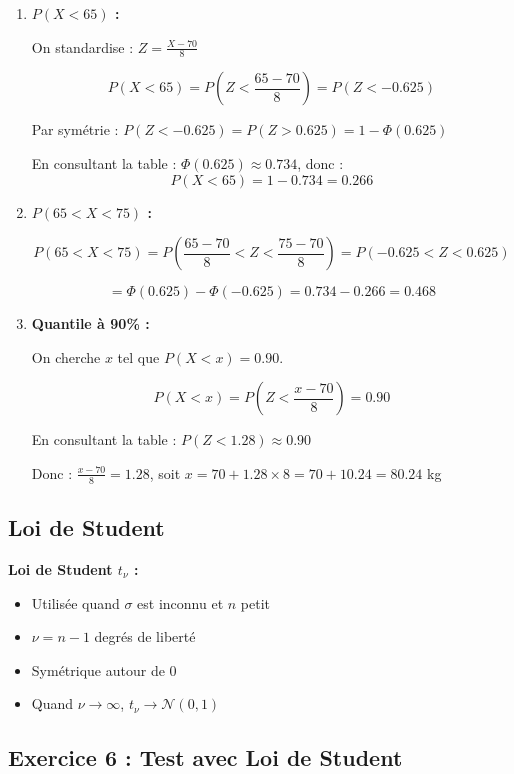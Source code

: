\documentclass[11pt,a4paper]{article}
\begin{document}
\begin{enumerate}
    \item \textbf{$P(X < 65)$ :}
    
    On standardise : $Z = \frac{X - 70}{8}$
    
    $$P(X < 65) = P\left(Z < \frac{65 - 70}{8}\right) = P(Z < -0.625)$$
    
    Par symétrie : $P(Z < -0.625) = P(Z > 0.625) = 1 - \Phi(0.625)$
    
    En consultant la table : $\Phi(0.625) \approx 0.734$, donc :
    $$P(X < 65) = 1 - 0.734 = 0.266$$
    
    \item \textbf{$P(65 < X < 75)$ :}
    
    $$P(65 < X < 75) = P\left(\frac{65 - 70}{8} < Z < \frac{75 - 70}{8}\right) = P(-0.625 < Z < 0.625)$$
    
    $$= \Phi(0.625) - \Phi(-0.625) = 0.734 - 0.266 = 0.468$$
    
    \item \textbf{Quantile à 90\% :}
    
    On cherche $x$ tel que $P(X < x) = 0.90$.
    
    $$P(X < x) = P\left(Z < \frac{x - 70}{8}\right) = 0.90$$
    
    En consultant la table : $P(Z < 1.28) \approx 0.90$
    
    Donc : $\frac{x - 70}{8} = 1.28$, soit $x = 70 + 1.28 \times 8 = 70 + 10.24 = 80.24$ kg
\end{enumerate}

\subsection{Loi de Student}

\begin{rappelbox}
\textbf{Loi de Student $t_\nu$ :}
\begin{itemize}
    \item Utilisée quand $\sigma$ est inconnu et $n$ petit
    \item $\nu = n - 1$ degrés de liberté
    \item Symétrique autour de 0
    \item Quand $\nu \to \infty$, $t_\nu \to \mathcal{N}(0, 1)$
\end{itemize}
\end{rappelbox}

\subsection{Exercice 6 : Test avec Loi de Student}
\end{document}
